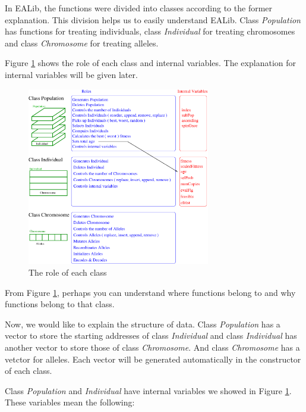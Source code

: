 \documentclass[twocolumn]{article}
\begin{document}
\noindent
In EALib, the functions were divided into classes according to
the former explanation. This division helps us to easily understand
EALib. Class {\em Population} has functions for treating
individuals, class {\em Individual} for treating chromosomes and
class {\em Chromosome} for treating alleles.

\noindent
Figure \ref{RoleOfClass} shows the role of each class and internal
variables. The explanation for internal variables will be given later.

\vspace*{5mm}

\begin{figure}[h]
\begin{center}
\includegraphics[width=8cm]{class-relationship.eps}
\caption{The role of each class}
\label{RoleOfClass}
\end{center}
\end{figure}

\noindent
From Figure \ref{RoleOfClass}, perhaps you can understand where functions belong
to and why functions belong to that class.

\noindent
Now, we would like to explain the structure of data. Class {\em
Population} has a vector to store the starting addresses of class {\em
Individual} and class {\em Individual} has another vector to store those 
of class {\em Chromosome}. And class {\em Chromosome} has a vetctor
for alleles. Each vector will be generated automatically in the
constructor of each class.

\noindent
Class {\em Population} and {\em Individual} have internal
variables we showed in Figure \ref{RoleOfClass}. These variables
mean the following:
\end{document}
